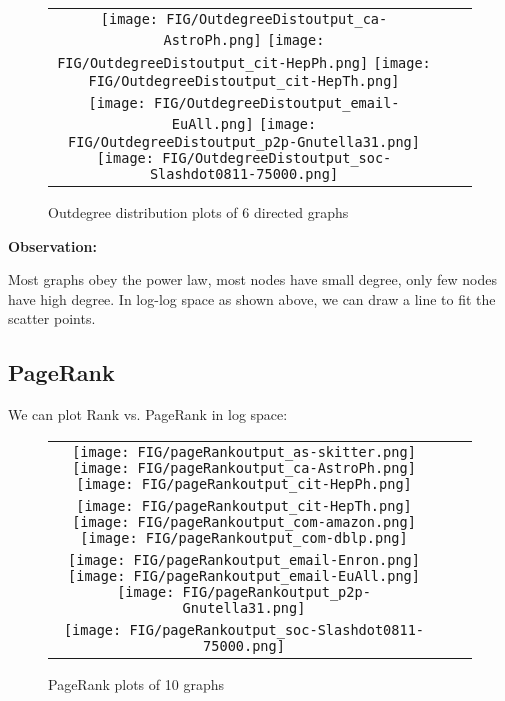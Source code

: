 \begin{figure}[H]
\begin{center}
\begin{tabular}{ccc}
     \texttt{[image: FIG/OutdegreeDistoutput\_ca-AstroPh.png]}
     \texttt{[image: FIG/OutdegreeDistoutput\_cit-HepPh.png]} 
     \texttt{[image: FIG/OutdegreeDistoutput\_cit-HepTh.png]} \\
     \texttt{[image: FIG/OutdegreeDistoutput\_email-EuAll.png]} 
     \texttt{[image: FIG/OutdegreeDistoutput\_p2p-Gnutella31.png]} 
     \texttt{[image: FIG/OutdegreeDistoutput\_soc-Slashdot0811-75000.png]} 
\end{tabular}
\caption{Outdegree distribution plots of 6 directed graphs}
\label{fig:results}
\end{center}
\end{figure}

\textbf{Observation:}
\par Most graphs obey the power law, most nodes have small degree, only few nodes have high degree. In log-log space as shown above, we can draw a line to fit the scatter points.

\subsection{PageRank}
We can plot Rank vs. PageRank in log space:

\begin{figure}[H]
\begin{center}
\begin{tabular}{ccc}
     \texttt{[image: FIG/pageRankoutput\_as-skitter.png]} 
     \texttt{[image: FIG/pageRankoutput\_ca-AstroPh.png]}
     \texttt{[image: FIG/pageRankoutput\_cit-HepPh.png]} \\
     \texttt{[image: FIG/pageRankoutput\_cit-HepTh.png]} 
     \texttt{[image: FIG/pageRankoutput\_com-amazon.png]} 
     \texttt{[image: FIG/pageRankoutput\_com-dblp.png]} \\
     \texttt{[image: FIG/pageRankoutput\_email-Enron.png]} 
     \texttt{[image: FIG/pageRankoutput\_email-EuAll.png]} 
     \texttt{[image: FIG/pageRankoutput\_p2p-Gnutella31.png]} \\
     \texttt{[image: FIG/pageRankoutput\_soc-Slashdot0811-75000.png]} 
\end{tabular}
\caption{PageRank plots of 10 graphs}
\label{fig:results}
\end{center}
\end{figure}

